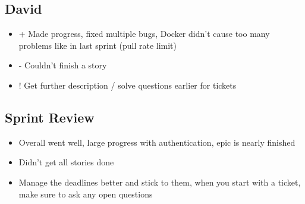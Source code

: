 \subsection{David}
\begin{itemize}
    \item + Made progress, fixed multiple bugs, Docker didn't cause too many problems like in last sprint (pull rate limit)
    \item - Couldn't finish a story
    \item ! Get further description / solve questions earlier for tickets
\end{itemize}

\subsection{Sprint Review}
\begin{itemize}
    \item Overall went well, large progress with authentication, epic is nearly finished
    \item Didn't get all stories done
    \item Manage the deadlines better and stick to them, when you start with a ticket, make sure to ask any open questions
\end{itemize}

